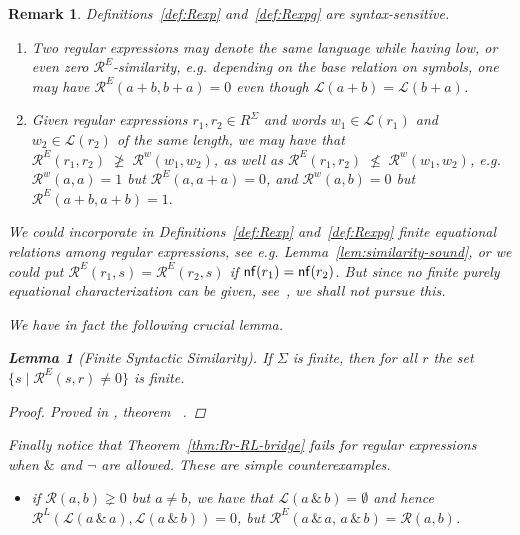\documentclass{article}
\def\eg{{\em e.g. }}
\newtheorem{lemma}{Lemma}[section]
\newtheorem{remark}{Remark}[section]
\begin{document}
\begin{remark}\label{rem:syntax-semantics-exceptions} 
Definitions~\ref{def:Rexp} and~\ref{def:Rexpg} are syntax-sensitive.%
\begin{enumerate}
\item Two regular expressions may denote the same language while having low, or even zero $\mathcal{R}^E$-similarity, \eg depending on the base relation on symbols, one may have
$
\mathcal{R}^E(a+b,b+a)=0
$
even though $\mathcal L(a+b)=\mathcal L(b+a)$.
\item Given regular expressions $r_1,r_2\in R^\Sigma$ and words $w_1\in \mathcal L(r_1)$ and $w_2\in \mathcal L(r_2)$ of the same length, we may have that $\mathcal{R}^{E}(r_1,r_2)\; \ngeq \; \mathcal R^w(w_1,w_2)$, as well as $\mathcal{R}^{E}(r_1,r_2)\; \nleq \; \mathcal R^w(w_1,w_2)$, \eg $\mathcal R^w(a,a)=1$ but $\mathcal{R}^{E}(a,a+a)=0$, and $\mathcal R^w(a,b)=0$ but $\mathcal{R}^{E}(a+b,a+b)=1.$
\end{enumerate}
We could incorporate in Definitions~\ref{def:Rexp} and~\ref{def:Rexpg} finite equational relations among regular expressions, see \eg Lemma~\ref{lem:similarity-sound}, or we could put $\mathcal R^E(r_1,s) = \mathcal R^E(r_2,s)$ if ${\sf nf}(r_1)={\sf nf}(r_2)$. But since no finite purely equational characterization can be given, see~\cite{Redko,Salomaa,Kozen}, we shall not pursue this.

We have in fact the following crucial lemma.
\begin{lemma}[Finite Syntactic Similarity]\label{lemma:syntactic-similarity}
If $\Sigma$ is finite, then for all $r$ the set $\{ s\mid \mathcal R^E(s,r)\neq 0\}$ is finite.
\end{lemma}
\begin{proof}
\begin{sloppypar}\raggedright
Proved in , theorem
~\cite{OurRocqRepo}.
\end{sloppypar}
\end{proof}

Finally notice that Theorem~\ref{thm:Rr-RL-bridge} fails for regular expressions when $\&$ and $\neg$ are
allowed. These are simple counterexamples.
\begin{itemize}\sloppy
\item[($\&$)] if $\mathcal R(a,b)\gneq 0$ but $a\neq b$, we have that
$\mathcal L(a\,\&\,b)=\emptyset$ and hence
$\mathcal R^L(\mathcal L(a\,\&\,a),\mathcal L(a\,\&\,b))=0$, but
$\mathcal R^E(a\,\&\,a,\,a\,\&\,b)=\mathcal R(a,b)$. 


\end{itemize}
\end{remark}
\end{document}
